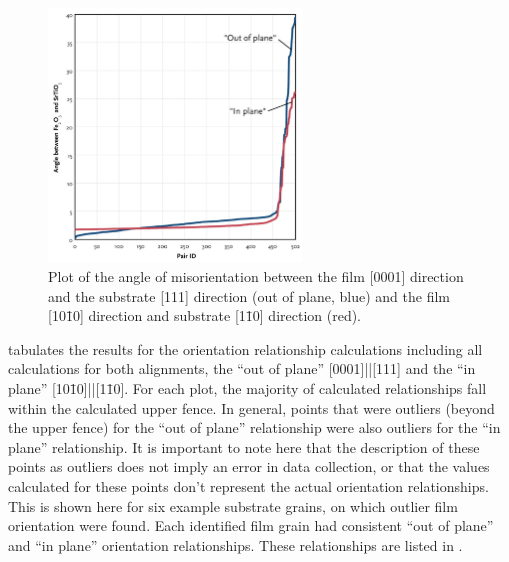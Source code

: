 \begin{figure}

	\begin{center}
\includegraphics[width=0.6\textwidth]{orplots.pdf}
		\caption[Plot of film-substrate misorientations]{%
			Plot of the angle of misorientation between the film
			[0001] direction and the substrate [111] direction (out of plane, 
			blue) and the film [10\={1}0] direction and substrate [1\={1}0] 
			direction (red).}
	\label{fig:orplots}
\end{center}
\end{figure}
 tabulates the results for the orientation relationship calculations
including all calculations for both alignments, the ``out of plane''
[0001]||[111] and the ``in plane''
[10\={1}0]||[1\={1}0]. For each plot, the majority of calculated
relationships fall within the calculated upper fence. In general, points that were
outliers (beyond the upper fence) for the ``out of plane'' relationship were also outliers
for the ``in plane'' relationship. It is important to note here that the description of
these points as outliers does not imply an error in data collection, or that the values
calculated for these points don't represent the actual orientation relationships. This is
shown here for six example substrate grains, on which outlier film orientation were found.
Each identified film grain had consistent ``out of plane'' and ``in plane'' orientation
relationships. These relationships are listed in .
